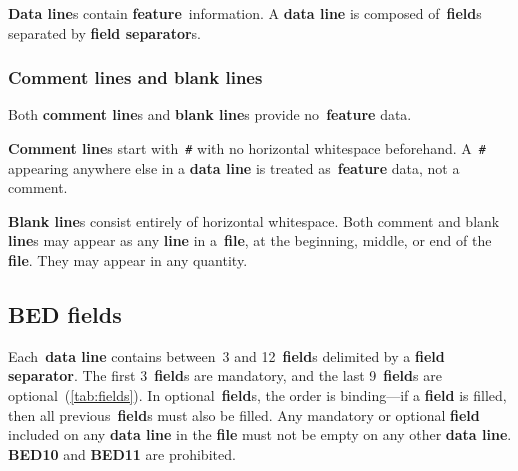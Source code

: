 \documentclass[11pt]{article}
\begin{document}
\textbf{Data line}s contain \textbf{feature}~information.
A \textbf{data line} is composed of~\textbf{field}s separated by \textbf{field separator}s.

\subsubsection{Comment lines and blank lines}

Both \textbf{comment line}s and \textbf{blank line}s provide no~\textbf{feature} data.

\textbf{Comment line}s start with~\texttt{\#} with no horizontal whitespace beforehand.
A~\texttt{\#} appearing anywhere else in a \textbf{data line} is treated as~\textbf{feature} data, not a comment.

\textbf{Blank line}s consist entirely of horizontal whitespace.
Both comment and blank \textbf{line}s may appear as any \textbf{line} in a~\textbf{file}, at the beginning, middle, or end of the \textbf{file}.
They may appear in any quantity.

\subsection{\acs{BED} fields}

Each~\textbf{data line} contains between~3 and 12~\textbf{field}s delimited by a \textbf{field separator}.
The first 3~\textbf{field}s are mandatory, and the last 9~\textbf{field}s are optional~(\autoref{tab:fields}).
In optional~\textbf{field}s, the order is binding---if a \textbf{field} is filled, then all previous~\textbf{field}s must also be filled.
Any mandatory or optional \textbf{field} included on any \textbf{data line} in the \textbf{file} must not be empty on any other \textbf{data line}.
\textbf{BED10} and \textbf{BED11} are prohibited.
\end{document}
